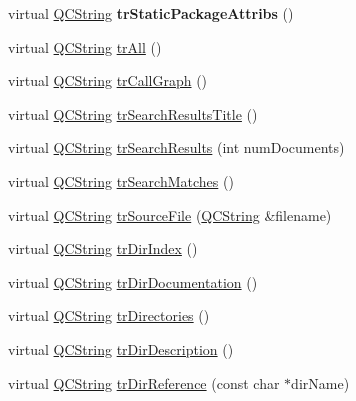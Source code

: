 \begin{DoxyCompactItemize}
\item 
\mbox{\label{class_translator_danish_a075bdd56e636834d9ab77f105864c7ff}} 
virtual \mbox{\hyperlink{class_q_c_string}{Q\+C\+String}} {\bfseries tr\+Static\+Package\+Attribs} ()
\item 
virtual \mbox{\hyperlink{class_q_c_string}{Q\+C\+String}} \mbox{\hyperlink{class_translator_danish_a95603ec5d4da100a4239606c48bd3a30}{tr\+All}} ()
\item 
virtual \mbox{\hyperlink{class_q_c_string}{Q\+C\+String}} \mbox{\hyperlink{class_translator_danish_ae932ffa641d9bbf298b28a63c4dd9e58}{tr\+Call\+Graph}} ()
\item 
virtual \mbox{\hyperlink{class_q_c_string}{Q\+C\+String}} \mbox{\hyperlink{class_translator_danish_a96dcc5dd9e7b1ee7bdcf140b78eee43d}{tr\+Search\+Results\+Title}} ()
\item 
virtual \mbox{\hyperlink{class_q_c_string}{Q\+C\+String}} \mbox{\hyperlink{class_translator_danish_a56db4f7240e3db3c645fe66c3f01fba5}{tr\+Search\+Results}} (int num\+Documents)
\item 
virtual \mbox{\hyperlink{class_q_c_string}{Q\+C\+String}} \mbox{\hyperlink{class_translator_danish_a07d7b2ce5706c959b8efbd1fba192472}{tr\+Search\+Matches}} ()
\item 
virtual \mbox{\hyperlink{class_q_c_string}{Q\+C\+String}} \mbox{\hyperlink{class_translator_danish_ac468aa253ba333d750aef289ab0a58e8}{tr\+Source\+File}} (\mbox{\hyperlink{class_q_c_string}{Q\+C\+String}} \&filename)
\item 
virtual \mbox{\hyperlink{class_q_c_string}{Q\+C\+String}} \mbox{\hyperlink{class_translator_danish_a78189c2d18b041d98b808b00052c8c00}{tr\+Dir\+Index}} ()
\item 
virtual \mbox{\hyperlink{class_q_c_string}{Q\+C\+String}} \mbox{\hyperlink{class_translator_danish_a879da65e434991246126ca67ed49fbb2}{tr\+Dir\+Documentation}} ()
\item 
virtual \mbox{\hyperlink{class_q_c_string}{Q\+C\+String}} \mbox{\hyperlink{class_translator_danish_a58e73287fb67094c6dc1c8824d83217f}{tr\+Directories}} ()
\item 
virtual \mbox{\hyperlink{class_q_c_string}{Q\+C\+String}} \mbox{\hyperlink{class_translator_danish_a1139152252f6ee748f8e7b4705987b16}{tr\+Dir\+Description}} ()
\item 
virtual \mbox{\hyperlink{class_q_c_string}{Q\+C\+String}} \mbox{\hyperlink{class_translator_danish_a730f238db6ef1b22b23610cd238991ec}{tr\+Dir\+Reference}} (const char $\ast$dir\+Name)

\end{DoxyCompactItemize}
